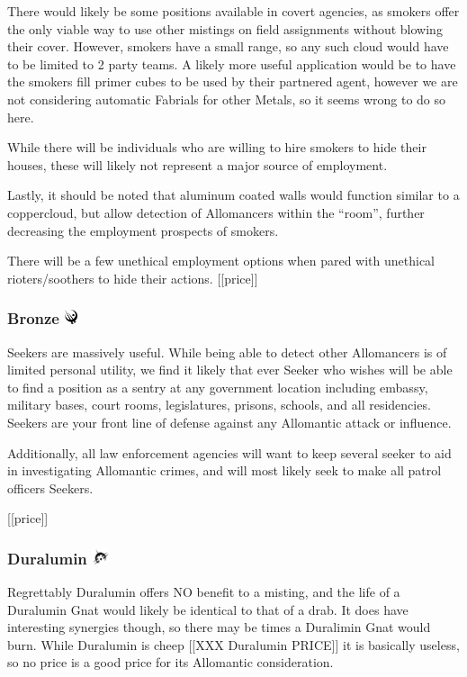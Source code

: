 \documentclass[conference]{IEEEtran}
\newcommand{\n}{\hfill\break}
\begin{document}
	There would likely be some positions available in covert agencies, as smokers offer the only viable way to use other mistings on field assignments without blowing their cover.  However, smokers have a small range, so any such cloud would have to be limited to 2 party teams.  A likely more useful application would be to have the smokers fill primer cubes to be used by their partnered agent, however we are not considering automatic Fabrials for other Metals, so it seems wrong to do so here.
	
	While there will be individuals who are willing to hire smokers to hide their houses, these will likely not represent a major source of employment.
	
	Lastly, it should be noted that aluminum coated walls would function similar to a coppercloud, but allow detection of Allomancers within the ``room'', further decreasing the employment prospects of smokers.
	
	There will be a few unethical employment options when pared with unethical rioters/soothers to hide their actions.
	[[price]]
	\subsubsection{\textbf{Bronze}    \includegraphics[height=1em]{images/Bronze.png}}\label{sec:mistings:bronze}
	Seekers are massively useful.  While being able to detect other Allomancers is of limited personal utility, we find it likely that ever Seeker who wishes will be able to find a position as a sentry at any government location including embassy, military bases, court rooms, legislatures, prisons, schools, and all residencies.  Seekers are your front line of defense against any Allomantic attack or influence. 
	
	Additionally, all law enforcement agencies will want to keep several seeker to aid in investigating Allomantic crimes, and will most likely seek to make all patrol officers Seekers.
	
	[[price]]
	\subsubsection{\textbf{Duralumin}    \includegraphics[height=1em]{images/Duralumin.png}}\label{sec:mistings:duralumin}
	Regrettably Duralumin offers NO benefit to a misting, and the life of a Duralumin Gnat would likely be identical to that of a drab.  It does have interesting synergies though, so there may be times a Duralimin Gnat would burn.
	\n
	While Duralumin is cheep [[XXX Duralumin PRICE]] it is basically useless, so no price is a good price for its Allomantic consideration.
\end{document}
